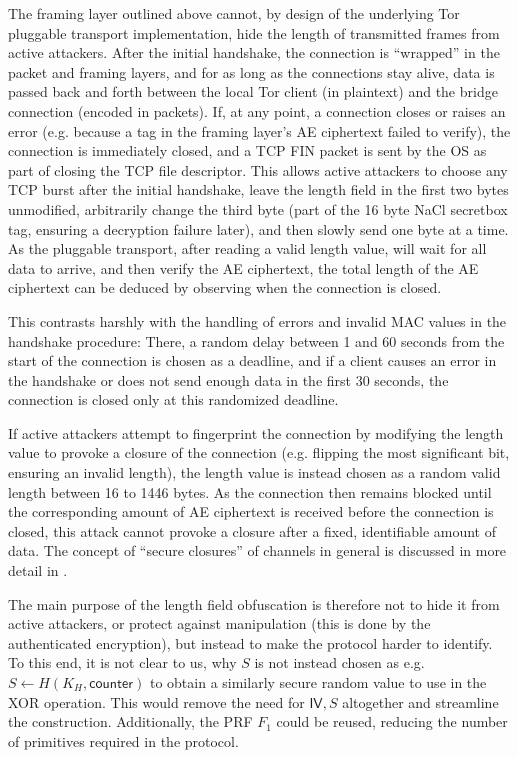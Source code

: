 The framing layer outlined above cannot, by design of the underlying Tor pluggable transport implementation, hide the length of transmitted frames from active attackers.
After the initial handshake, the connection is ``wrapped'' in the packet and framing layers, and for as long as the connections stay alive, data is passed back and forth between the local Tor client (in plaintext) and the bridge connection (encoded in packets).
If, at any point, a connection closes or raises an error (e.g. because a tag in the framing layer's AE ciphertext failed to verify), the connection is immediately closed, and a TCP FIN packet is sent by the OS as part of closing the TCP file descriptor.
This allows active attackers to choose any TCP burst after the initial handshake, leave the length field in the first two bytes unmodified, arbitrarily change the third byte (part of the 16 byte NaCl secretbox tag, ensuring a decryption failure later), and then slowly send one byte at a time. As the pluggable transport, after reading a valid length value, will wait for all data to arrive, and then verify the AE ciphertext, the total length of the AE ciphertext can be deduced by observing when the connection is closed.

This contrasts harshly with the handling of errors and invalid MAC values in the handshake procedure: There, a random delay between 1 and 60 seconds from the start of the connection is chosen as a deadline, and if a client causes an error in the handshake or does not send enough data in the first 30 seconds, the connection is closed only at this randomized deadline.

If active attackers attempt to fingerprint the connection by modifying the length value to provoke a closure of the connection (e.g. flipping the most significant bit, ensuring an invalid length), the length value is instead chosen as a random valid length between 16 to 1446 bytes. As the connection then remains blocked until the corresponding amount of AE ciphertext is received before the connection is closed, this attack cannot provoke a closure after a fixed, identifiable amount of data. The concept of ``secure closures'' of channels in general is discussed in more detail in \cite{Fenske2024}.

The main purpose of the length field obfuscation is therefore not to hide it from active attackers, or protect against manipulation (this is done by the authenticated encryption), but instead to make the protocol harder to identify. To this end, it is not clear to us, why $S$ is not instead chosen as e.g.~$S \gets H(K_H, \mathsf{counter})$ to obtain a similarly secure random value to use in the XOR operation. This would remove the need for $\mathsf{IV}, S$ altogether and streamline the construction. Additionally, the \drivel{} PRF $F_1$ could be reused, reducing the number of primitives required in the protocol.

